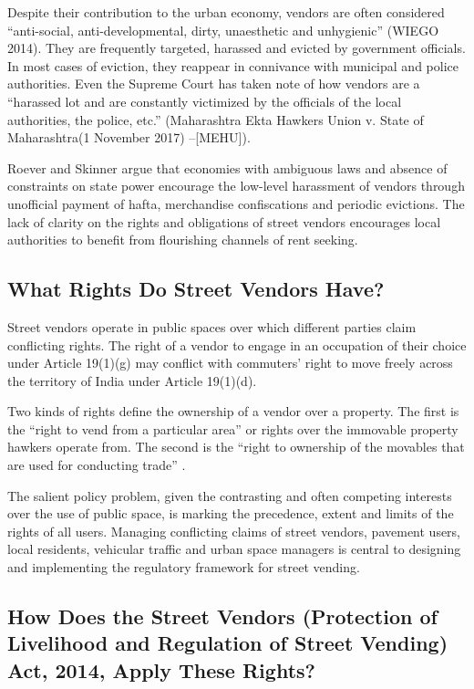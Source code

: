\documentclass[a4paper, 12pt, twoside]{article}
\begin{document}
Despite their contribution to the urban economy, vendors are often considered “anti-social, anti-developmental, dirty, unaesthetic and unhygienic” (WIEGO 2014). They are frequently targeted, harassed and evicted by government officials. In most cases of eviction, they reappear in connivance with municipal and police authorities. Even the Supreme Court has taken note of how vendors are a “harassed lot and are constantly victimized by the officials of the local authorities, the police, etc.” (Maharashtra Ekta Hawkers Union v. State of Maharashtra(1 November 2017) –[MEHU]).

Roever and Skinner \parencite{(2016)} argue that economies with ambiguous laws and absence of constraints on state power encourage the low-level harassment of vendors through unofficial payment of hafta, merchandise confiscations and periodic evictions. The lack of clarity on the rights and obligations of street vendors encourages local authorities to benefit from flourishing channels of rent seeking. 

\subsection{What Rights Do Street Vendors Have?}
Street vendors operate in public spaces over which different parties claim conflicting rights. The right of a  vendor to engage in an occupation of their choice under Article 19(1)(g) may conflict with commuters’ right to move freely across the territory of India under Article 19(1)(d). 

Two kinds of rights define the ownership of a vendor over a property. The first is the “right to vend from a particular area” or rights over the immovable property hawkers operate from. The second is the “right to ownership of the movables that are used for conducting trade” \parencite{(Centre for Civil Society 2015)}.

The salient policy problem, given the contrasting and often competing interests over the use of public space, is marking the precedence, extent and limits of the rights of all users. Managing conflicting claims of street vendors, pavement users, local residents, vehicular traffic and urban space managers is central to designing and implementing the regulatory framework for street vending.

\subsection{How Does the Street Vendors (Protection of Livelihood and Regulation of Street Vending) Act, 2014, Apply These Rights?}
\end{document}
